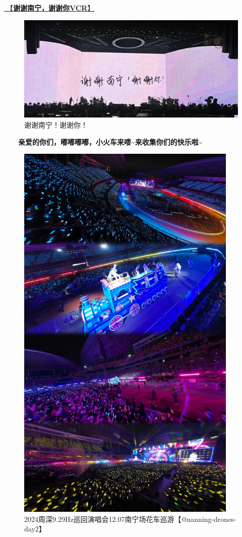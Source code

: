 \documentclass[]{ctexbook}
\begin{document}
\hyperref[thank-you-vcr]{🎥【\textbf{谢谢南宁，谢谢你VCR}】}

\begin{figure}

{\centering \includegraphics[width=400pt]{img/nanning20241207/thank-nanning} 

}

\caption{谢谢南宁！谢谢你！}\label{fig:unnamed-chunk-162}
\end{figure}

  \textbf{亲爱的你们，嘟嘟嘟嘟，小火车来喽\textasciitilde 来收集你们的快乐啦\textasciitilde{}}

\begin{figure}

{\centering \includegraphics[width=300pt]{img/nanning20241207/002} 

}

\caption{2024周深9.29Hz巡回演唱会12.07南宁场花车巡游【@nanning-drones-day2】}\label{fig:unnamed-chunk-163}
\end{figure}
\end{document}
